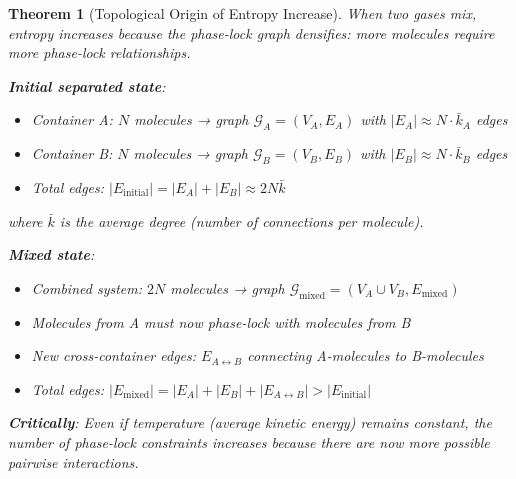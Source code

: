 \documentclass[12pt,a4paper]{article}
\newtheorem{theorem}{Theorem}[section]
\theoremstyle{remark}
\begin{document}
\begin{theorem}[Topological Origin of Entropy Increase]
\label{thm:topological_entropy}
When two gases mix, entropy increases because the phase-lock graph densifies: more molecules require more phase-lock relationships.

\textbf{Initial separated state}:
\begin{itemize}
\item Container A: $N$ molecules → graph $\mathcal{G}_A = (V_A, E_A)$ with $|E_A| \approx N \cdot \bar{k}_A$ edges
\item Container B: $N$ molecules → graph $\mathcal{G}_B = (V_B, E_B)$ with $|E_B| \approx N \cdot \bar{k}_B$ edges
\item Total edges: $|E_{\text{initial}}| = |E_A| + |E_B| \approx 2N\bar{k}$
\end{itemize}

where $\bar{k}$ is the average degree (number of connections per molecule).

\textbf{Mixed state}:
\begin{itemize}
\item Combined system: $2N$ molecules → graph $\mathcal{G}_{\text{mixed}} = (V_A \cup V_B, E_{\text{mixed}})$
\item Molecules from A must now phase-lock with molecules from B
\item New cross-container edges: $E_{A \leftrightarrow B}$ connecting A-molecules to B-molecules
\item Total edges: $|E_{\text{mixed}}| = |E_A| + |E_B| + |E_{A \leftrightarrow B}| > |E_{\text{initial}}|$
\end{itemize}

\textbf{Critically}: Even if temperature (average kinetic energy) remains constant, the number of phase-lock constraints increases because there are now more possible pairwise interactions.
\end{theorem}
\end{document}
